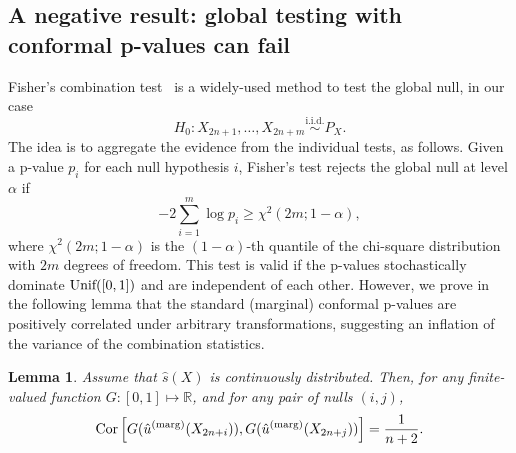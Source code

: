 \documentclass[11pt]{article}
\newtheorem{lemma}{Lemma}
\newcommand{\Unif}{\textnormal{Unif}}
\def\R{\mathbb{R}}
\def\marg{\textnormal{(marg)}}
\begin{document}
\subsection{A negative result: global testing with conformal p-values can fail} \label{sec:fisher}

Fisher's combination test~\citep{fisher1925statistical} is a widely-used method to test the global null, in our case
$$
H_{0}: X_{2n+1}, \ldots, X_{2n + m}\stackrel{\mathrm{i.i.d.}}{\sim} P_{X}.
$$
The idea is to aggregate the evidence from the individual tests, as follows. Given a p-value $p_i$ for each null hypothesis $i$, Fisher's test rejects the global null at level $\alpha$ if
\[-2 \sum_{i=1}^{m} \log p_{i} \ge \chi^2(2m; 1 - \alpha),\]
where $\chi^2(2m; 1 - \alpha)$ is the $(1 - \alpha)$-th quantile of the chi-square distribution with $2m$ degrees of freedom.
This test is valid if the p-values stochastically dominate $\Unif([0, 1])$ and are independent of each other. However, we prove in the following lemma that the standard (marginal) conformal p-values are positively correlated under arbitrary transformations, suggesting an inflation of the variance of the combination statistics.

\begin{lemma}\label{lem:pairwise_correlation}
Assume that $\hat{s}(X)$ is continuously distributed. Then, for any finite-valued function $G: [0, 1]\mapsto \R$, and for any pair of nulls $(i, j)$,
\[\mathrm{Cor}\left[ G(\hat{u}^\marg(X_{2n+i})), G(\hat{u}^\marg(X_{2n+j})) \right] = \frac{1}{n+2}.\]
\end{lemma}
\end{document}
